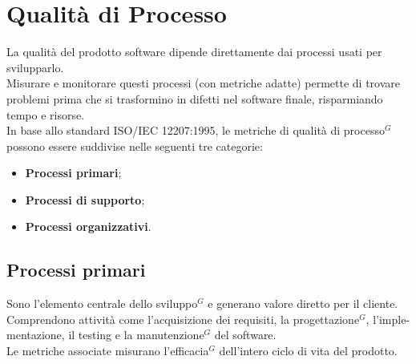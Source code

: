 \section{Qualità di Processo}
La qualità del prodotto software dipende direttamente dai processi usati per svilupparlo.\\  
Misurare e monitorare questi processi (con metriche adatte) permette di trovare problemi prima che si trasformino in difetti nel software finale, risparmiando tempo e risorse.\\
In base allo standard ISO/IEC 12207:1995, le metriche di qualità di processo$^G$ possono essere suddivise nelle seguenti tre categorie:
\begin{itemize}[itemsep=0pt, parsep=1pt, label=$\scriptstyle\bullet$]
        \item \textbf{Processi primari};
        \item \textbf{Processi di supporto};
        \item \textbf{Processi organizzativi}.
\end{itemize}

\subsection{Processi primari}
Sono l’elemento centrale dello sviluppo$^G$ e generano valore diretto per il cliente.\\ 
Comprendono attività come l’acquisizione dei requisiti, la progettazione$^G$, l'imple-\newline mentazione, il testing e la manutenzione$^G$ del software.\\
Le metriche associate misurano l’efficacia$^G$ dell’intero ciclo di vita del prodotto.

